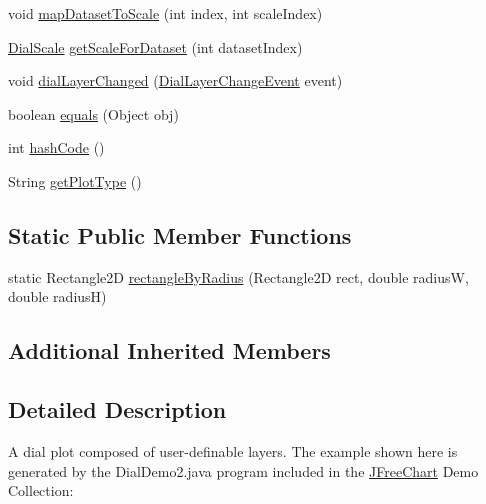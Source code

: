 \begin{DoxyCompactItemize}
\item 
void \mbox{\hyperlink{classorg_1_1jfree_1_1chart_1_1plot_1_1dial_1_1_dial_plot_ac5110fce422dc6bf4a1ac579b3aec666}{map\+Dataset\+To\+Scale}} (int index, int scale\+Index)
\item 
\mbox{\hyperlink{interfaceorg_1_1jfree_1_1chart_1_1plot_1_1dial_1_1_dial_scale}{Dial\+Scale}} \mbox{\hyperlink{classorg_1_1jfree_1_1chart_1_1plot_1_1dial_1_1_dial_plot_a7cd88f2ef804afaf946a477b47d57a42}{get\+Scale\+For\+Dataset}} (int dataset\+Index)
\item 
void \mbox{\hyperlink{classorg_1_1jfree_1_1chart_1_1plot_1_1dial_1_1_dial_plot_aaa3708c0186d65525c74e859c5232e39}{dial\+Layer\+Changed}} (\mbox{\hyperlink{classorg_1_1jfree_1_1chart_1_1plot_1_1dial_1_1_dial_layer_change_event}{Dial\+Layer\+Change\+Event}} event)
\item 
boolean \mbox{\hyperlink{classorg_1_1jfree_1_1chart_1_1plot_1_1dial_1_1_dial_plot_a5e60320b4d6d3af27a2feb89381bd88e}{equals}} (Object obj)
\item 
int \mbox{\hyperlink{classorg_1_1jfree_1_1chart_1_1plot_1_1dial_1_1_dial_plot_a3780e1153380d4ee9340c01e2461d727}{hash\+Code}} ()
\item 
String \mbox{\hyperlink{classorg_1_1jfree_1_1chart_1_1plot_1_1dial_1_1_dial_plot_a10534549178659929ef65c4cd438a89e}{get\+Plot\+Type}} ()
\end{DoxyCompactItemize}
\subsection*{Static Public Member Functions}
\begin{DoxyCompactItemize}
\item 
static Rectangle2D \mbox{\hyperlink{classorg_1_1jfree_1_1chart_1_1plot_1_1dial_1_1_dial_plot_ac83736934eac0d509bc7989539196055}{rectangle\+By\+Radius}} (Rectangle2D rect, double radiusW, double radiusH)
\end{DoxyCompactItemize}
\subsection*{Additional Inherited Members}


\subsection{Detailed Description}
A dial plot composed of user-\/definable layers. The example shown here is generated by the {\ttfamily Dial\+Demo2.\+java} program included in the \mbox{\hyperlink{classorg_1_1jfree_1_1chart_1_1_j_free_chart}{J\+Free\+Chart}} Demo Collection\+: ~\newline
~\newline
 

